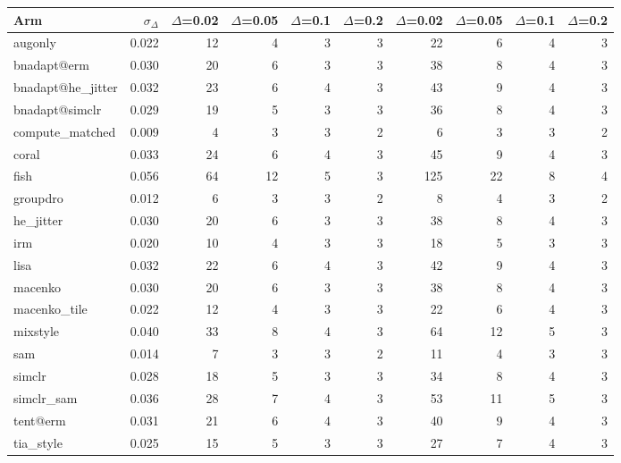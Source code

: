 \begin{tabular}{lrrrrrrrrr}
\toprule
Arm & $\sigma_\Delta$ & $\Delta$=0.02 & $\Delta$=0.05 & $\Delta$=0.1 & $\Delta$=0.2 & $\Delta$=0.02 & $\Delta$=0.05 & $\Delta$=0.1 & $\Delta$=0.2 \\
\midrule
augonly & 0.022 & 12 & 4 & 3 & 3 & 22 & 6 & 4 & 3 \\
bnadapt@erm & 0.030 & 20 & 6 & 3 & 3 & 38 & 8 & 4 & 3 \\
bnadapt@he\_jitter & 0.032 & 23 & 6 & 4 & 3 & 43 & 9 & 4 & 3 \\
bnadapt@simclr & 0.029 & 19 & 5 & 3 & 3 & 36 & 8 & 4 & 3 \\
compute\_matched & 0.009 & 4 & 3 & 3 & 2 & 6 & 3 & 3 & 2 \\
coral & 0.033 & 24 & 6 & 4 & 3 & 45 & 9 & 4 & 3 \\
fish & 0.056 & 64 & 12 & 5 & 3 & 125 & 22 & 8 & 4 \\
groupdro & 0.012 & 6 & 3 & 3 & 2 & 8 & 4 & 3 & 2 \\
he\_jitter & 0.030 & 20 & 6 & 3 & 3 & 38 & 8 & 4 & 3 \\
irm & 0.020 & 10 & 4 & 3 & 3 & 18 & 5 & 3 & 3 \\
lisa & 0.032 & 22 & 6 & 4 & 3 & 42 & 9 & 4 & 3 \\
macenko & 0.030 & 20 & 6 & 3 & 3 & 38 & 8 & 4 & 3 \\
macenko\_tile & 0.022 & 12 & 4 & 3 & 3 & 22 & 6 & 4 & 3 \\
mixstyle & 0.040 & 33 & 8 & 4 & 3 & 64 & 12 & 5 & 3 \\
sam & 0.014 & 7 & 3 & 3 & 2 & 11 & 4 & 3 & 3 \\
simclr & 0.028 & 18 & 5 & 3 & 3 & 34 & 8 & 4 & 3 \\
simclr\_sam & 0.036 & 28 & 7 & 4 & 3 & 53 & 11 & 5 & 3 \\
tent@erm & 0.031 & 21 & 6 & 4 & 3 & 40 & 9 & 4 & 3 \\
tia\_style & 0.025 & 15 & 5 & 3 & 3 & 27 & 7 & 4 & 3 \\
\bottomrule
\end{tabular}
